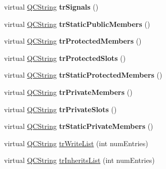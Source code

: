 \begin{DoxyCompactItemize}
virtual \mbox{\hyperlink{class_q_c_string}{Q\+C\+String}} {\bfseries tr\+Signals} ()
\item 
\mbox{\label{class_translator_norwegian_afd59f0d6acd23335906d3083816e96ff}} 
virtual \mbox{\hyperlink{class_q_c_string}{Q\+C\+String}} {\bfseries tr\+Static\+Public\+Members} ()
\item 
\mbox{\label{class_translator_norwegian_aaf9918df4485eba1301812f7c93c724f}} 
virtual \mbox{\hyperlink{class_q_c_string}{Q\+C\+String}} {\bfseries tr\+Protected\+Members} ()
\item 
\mbox{\label{class_translator_norwegian_a62f1d3e5b2cea7b6d686e89636fdcf53}} 
virtual \mbox{\hyperlink{class_q_c_string}{Q\+C\+String}} {\bfseries tr\+Protected\+Slots} ()
\item 
\mbox{\label{class_translator_norwegian_a7a1e26c209daa24a8994b91ab2d44065}} 
virtual \mbox{\hyperlink{class_q_c_string}{Q\+C\+String}} {\bfseries tr\+Static\+Protected\+Members} ()
\item 
\mbox{\label{class_translator_norwegian_a98bbc3ebc44360a038d26dc9966f2b5a}} 
virtual \mbox{\hyperlink{class_q_c_string}{Q\+C\+String}} {\bfseries tr\+Private\+Members} ()
\item 
\mbox{\label{class_translator_norwegian_a5b2581e2357279017ab71c62289f3c39}} 
virtual \mbox{\hyperlink{class_q_c_string}{Q\+C\+String}} {\bfseries tr\+Private\+Slots} ()
\item 
\mbox{\label{class_translator_norwegian_a3f51f8eea43429809f3825ed553b7719}} 
virtual \mbox{\hyperlink{class_q_c_string}{Q\+C\+String}} {\bfseries tr\+Static\+Private\+Members} ()
\item 
virtual \mbox{\hyperlink{class_q_c_string}{Q\+C\+String}} \mbox{\hyperlink{class_translator_norwegian_a9a778642085f53f98ef05c1e4b6db7f1}{tr\+Write\+List}} (int num\+Entries)
\item 
virtual \mbox{\hyperlink{class_q_c_string}{Q\+C\+String}} \mbox{\hyperlink{class_translator_norwegian_a2b9e664b354be825117c1d2847f15e49}{tr\+Inherits\+List}} (int num\+Entries)
\item 

\end{DoxyCompactItemize}
